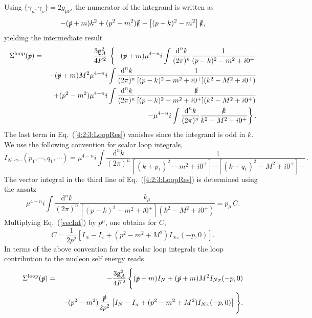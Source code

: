 \documentclass[twoside,12pt]{article}
\begin{document}
Using $ \{\gamma_\mu, \gamma_\nu\}=2g_{\mu\nu}$, the numerator of the integrand
is written as
\begin{displaymath}
\label{Num}
    -(\slashed{p}+m)k^2+(p^2-m^2)\slashed{k}
    -\left[(p-k)^2-m^2\right]\slashed{k},
\end{displaymath}
yielding the intermediate result
\begin{eqnarray}
\label{4:2:3:LoopRes}
\Sigma^{\rm loop}(\slashed{p})&=&
  \frac{3\texttt{g}_{A}^2}{4F^2}\,
  \left\{-(\slashed{p}+m)\mu^{4-n}i\int\frac{\mbox{d}^nk}{(2\pi)^n}
  \frac{1}{(p-k)^2-m^2+i0^+}\right.\nonumber\\
&&-(\slashed{p}+m)M^2\mu^{4-n}i\int\frac{\mbox{d}^nk}{(2\pi)^n}
  \frac{1}{[(p-k)^2-m^2+i0^+](k^2-M^2+i0^+)}\nonumber\\
&&
+(p^2-m^2)\mu^{4-n}i\int\frac{\mbox{d}^nk}{(2\pi)^n}
  \frac{\slashed{k}}{[(p-k)^2-m^2+i0^+](k^2-M^2+i0^+)}\nonumber\\
&& \left.-\mu^{4-n}i\int\frac{\mbox{d}^nk}{(2\pi)^n}
\frac{\slashed{k}}{k^2-M^2+i0^+}\right\}.
\end{eqnarray}
   The last term in Eq.~(\ref{4:2:3:LoopRes}) vanishes since the
integrand is odd in $k$.
   We use the following convention for scalar loop integrals,
\begin{equation}
\label{scalarInt}
I_{N\cdots\pi\cdots}(p_1,\cdots,q_1,\cdots)
=\mu^{4-n}i\int\frac{\mbox{d}^nk}{(2\pi)^n}
    \frac{1}{[(k+p_1)^2-m^2+i0^+]\cdots[(k+q_1)^2-M^2+i0^+]\cdots}\,.
\end{equation}
   The vector integral in the third line of Eq.~(\ref{4:2:3:LoopRes}) is
determined using the ansatz
\begin{equation}\label{vecInt}
    \mu^{4-n}i\int\frac{\mbox{d}^nk}{(2\pi)^n}
  \frac{k_\mu}{[(p-k)^2-m^2+i0^+](k^2-M^2+i0^+)}=
  p_\mu \, C.
\end{equation}
Multiplying Eq.~(\ref{vecInt}) by $p^\mu$, one obtains for $C$,
\begin{equation}\label{C}
    C=\frac{1}{2p^2}\left[I_N-I_\pi+(p^2-m^2+M^2)I_{N\pi}(-p,0)\right].
\end{equation}
   In terms of the above convention for the scalar loop integrals the loop contribution
to the nucleon self energy reads
\begin{eqnarray}
\label{4:2:3:LoopResInt}
\Sigma^{\rm loop}(\slashed{p})
&=&-\frac{3\texttt{g}_{A}^2}{4F^2}\,\Bigg\{
(\slashed{p}+m)I_N+(\slashed{p}+m)M^2 I_{N\pi}(-p,0)\nonumber\\
&&-(p^2-m^2)\frac{\slashed{p}}{2p^2}
\left[I_N-I_\pi+(p^2-m^2+M^2)I_{N\pi}(-p,0)\right]\Bigg\}.
\end{eqnarray}
\end{document}
